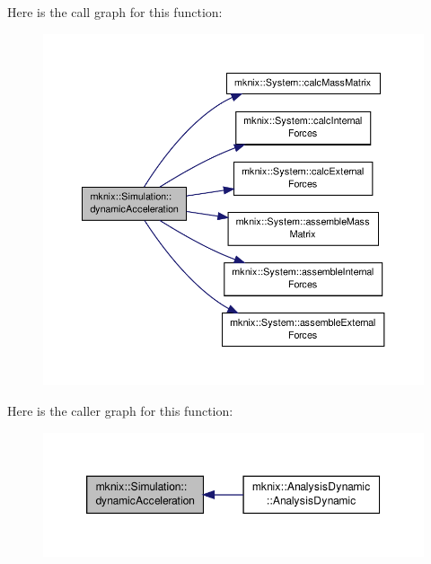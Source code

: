 Here is the call graph for this function\-:\nopagebreak
\begin{figure}[H]
\begin{center}
\leavevmode
\includegraphics[width=350pt]{db/d0b/classmknix_1_1_simulation_ace4ce2a959690e14c443b3c6e83c2690_cgraph}
\end{center}
\end{figure}




Here is the caller graph for this function\-:\nopagebreak
\begin{figure}[H]
\begin{center}
\leavevmode
\includegraphics[width=350pt]{db/d0b/classmknix_1_1_simulation_ace4ce2a959690e14c443b3c6e83c2690_icgraph}
\end{center}
\end{figure}


